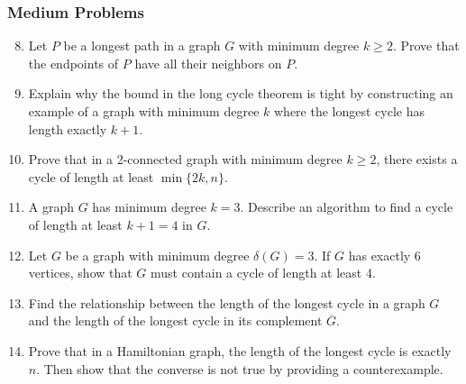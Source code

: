 \documentclass{article}
\theoremstyle{definition}
\begin{document}
\subsubsection{Medium Problems}
\begin{enumerate}\setcounter{enumi}{7}
\item Let $P$ be a longest path in a graph $G$ with minimum degree $k \geq 2$. Prove that the endpoints of $P$ have all their neighbors on $P$.

\item Explain why the bound in the long cycle theorem is tight by constructing an example of a graph with minimum degree $k$ where the longest cycle has length exactly $k+1$.

\item Prove that in a 2-connected graph with minimum degree $k \geq 2$, there exists a cycle of length at least $\min\{2k, n\}$.

\item A graph $G$ has minimum degree $k=3$. Describe an algorithm to find a cycle of length at least $k+1=4$ in $G$.

\item Let $G$ be a graph with minimum degree $\delta(G) = 3$. If $G$ has exactly 6 vertices, show that $G$ must contain a cycle of length at least 4.

\item Find the relationship between the length of the longest cycle in a graph $G$ and the length of the longest cycle in its complement $\overline{G}$.

\item Prove that in a Hamiltonian graph, the length of the longest cycle is exactly $n$. Then show that the converse is not true by providing a counterexample.
\end{enumerate}
\end{document}
